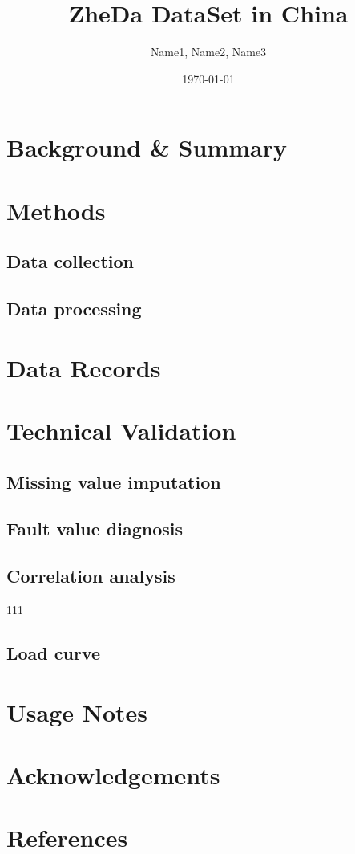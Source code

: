 \documentclass[12pt]{article}
\title{ZheDa DataSet in China}
\author{Name1, Name2, Name3}
\date{\today}
\begin{document}
\maketitle

\begin{abstract}
\end{abstract}

\section*{Background \& Summary}

\section*{Methods}
\subsection*{Data collection}

\subsection*{Data processing}

\section*{Data Records}

\section*{Technical Validation}
\subsection*{Missing value imputation}

\subsection*{Fault value diagnosis}

\subsection*{Correlation analysis}
111\cite{example1}
\subsection*{Load curve}

\section*{Usage Notes}

\section*{Acknowledgements}

\section*{References}
\end{document}
